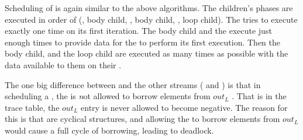 Scheduling of {{\feedbackloops}} is again similar to the above
algorithms.  The children's phases are executed in order of
({\splitter}, body child, {\joiner}, body child, {\splitter}, loop
child).  The {\splitter} tries to execute exactly one time on its
first iteration.  The body child and the {\joiner} execute just
enough times to provide data for the {\splitter} to perform its
first execution.  Then the body child, {\splitter} and the loop
child are executed as many times as possible with the data
available to them on their {\Input} {{\Channels}}.

The one big difference between {{\feedbackloop}} and the other streams
({\pipeline} and {\splitjoin}) is that in scheduling a {{\feedbackloop}},
the {\joiner} is {\emph not} allowed to borrow elements from $out_L$
{{\Channel}}.  That is in the trace table, the $out_L$ entry is never
allowed to become negative.  The reason for this is that
{{\feedbackloops}} are cyclical structures, and allowing the {\joiner}
to borrow elements from $out_L$ would cause a full cycle of
borrowing, leading to deadlock.

